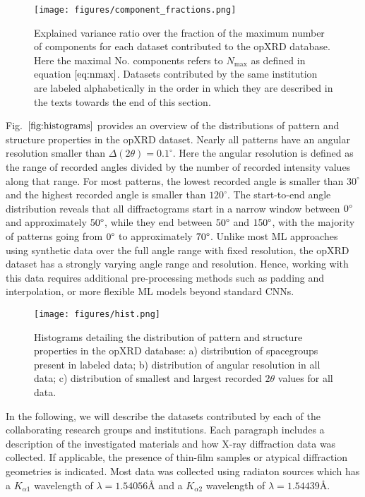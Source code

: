 \begin{figure}[!htb]
    \centering
    \texttt{[image: figures/component\_fractions.png]}
    \caption{Explained variance ratio over the fraction of the maximum number of components for each dataset contributed to the opXRD database. Here the maximal No. components refers to $N_{\text{max}}$ as defined in equation $\eqref{eq:nmax}$. Datasets contributed by the same institution are labeled alphabetically in the order in which they are described in the texts towards the end of this section.}
    \label{fig:components}
\end{figure}

Fig.~$\eqref{fig:histograms}$ provides an overview of the distributions of pattern and structure properties in the opXRD dataset. Nearly all patterns have an angular resolution smaller than $\Delta(2\theta) = 0.1 ^\circ$. Here the angular resolution is defined as the range of recorded angles divided by the number of recorded intensity values along that range. For most patterns, the lowest recorded angle is smaller than $30 ^\circ$ and the highest recorded angle is smaller than $120 ^\circ$. The start-to-end angle distribution reveals that all diffractograms start in a narrow window between $0\degree$ and approximately $50\degree$, while they end between $50\degree$ and $150\degree$, with the majority of patterns going from $0\degree$ to approximately $70\degree$. Unlike most ML approaches using synthetic data over the full angle range with fixed resolution, the opXRD dataset has a strongly varying angle range and resolution. Hence, working with this data requires additional pre-processing methods such as padding and interpolation, or more flexible ML models beyond standard CNNs.

\begin{figure}[!htb]
    \centering
    \texttt{[image: figures/hist.png]}
    \caption{Histograms detailing the distribution of pattern and structure properties in the opXRD database: a) distribution of spacegroups present in labeled data; b) distribution of angular resolution in all data; c) distribution of smallest and largest recorded $2\theta$ values for all data.}
    \label{fig:histograms}
\end{figure}

In the following, we will describe the datasets contributed by each of the collaborating research groups and institutions. Each paragraph includes a description of the investigated materials and how X-ray diffraction data was collected. If applicable, the presence of thin-film samples or atypical diffraction geometries is indicated. Most data was collected using  radiaton sources which has a $K_{\alpha1}$ wavelength of $\lambda=1.54056\text{\AA}$ and a $K_{\alpha2}$ wavelength of $\lambda=1.54439\text{\AA}$.

